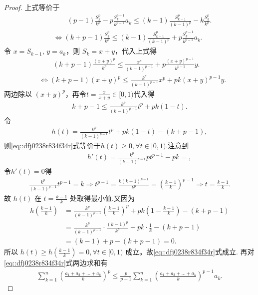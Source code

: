 \documentclass[../../main.tex]{subfiles}
\begin{document}
\begin{proof}
上式等价于
\begin{align*}
&\qquad (p-1)\frac{S_{k}^{p}}{k^p}-p\frac{S_{k}^{p-1}}{k^{p-1}}a_k\leqslant (k-1)\frac{S_{k-1}^{p}}{(k-1)^p}-k\frac{S_{k}^{p}}{k^p}.
\\
&\Longleftrightarrow (k+p-1)\frac{S_{k}^{p}}{k^p}\leqslant (k-1)\frac{S_{k-1}^{p}}{(k-1)^p}+p\frac{S_{k}^{p-1}}{k^{p-1}}a_k.
\end{align*}
令 $x = S_{k-1}$, $y = a_k$，则 $S_k = x + y$，代入上式得
\begin{align*}
&\qquad (k+p-1)\frac{(x+y)^p}{k^p}\leqslant \frac{x^p}{(k-1)^{p-1}}+p\frac{(x+y)^{p-1}}{k^{p-1}}y.
\\
&\Longleftrightarrow (k+p-1)(x+y)^p\leqslant \frac{k^p}{(k-1)^{p-1}}x^p+pk(x+y)^{p-1}y.
\end{align*}
两边除以 $(x+y)^p$，再令$t = \frac{x}{x+y} \in [0,1)$代入得
\begin{align*}
k+p-1 \leqslant \frac{k^p}{(k-1)^{p-1}} t^p + p k (1-t).
\end{align*}
令
\begin{align*}
h(t) = \frac{k^p}{(k-1)^{p-1}} t^p + p k (1-t) - (k+p-1),
\end{align*}
则\eqref{eq::dfj0238r834f34r}式等价于$h(t)\geqslant 0,\forall t\in [0,1).$注意到
\begin{align*}
&\qquad h'(t) = \frac{k^p}{(k-1)^{p-1}} p t^{p-1} - p k=,
\end{align*}
令$h'(t)=0$得
\begin{align*}
\frac{k^p}{(k-1)^{p-1}}t^{p-1}=k\Longrightarrow t^{p-1}=\frac{k(k-1)^{p-1}}{k^p}=\left( \frac{k-1}{k} \right) ^{p-1}\Longrightarrow t=\frac{k-1}{k}.
\end{align*}
故 $h(t)$ 在 $t = \frac{k-1}{k}$ 处取得最小值.又因为
\begin{align*}
h\left( \frac{k-1}{k} \right) &= \frac{k^p}{(k-1)^{p-1}} \left( \frac{k-1}{k} \right)^p + p k \left(1 - \frac{k-1}{k} \right) - (k+p-1) \\
&= \frac{k^p}{(k-1)^{p-1}} \cdot \frac{(k-1)^p}{k^p} + p k \cdot \frac{1}{k} - (k+p-1) \\
&= (k-1) + p - (k+p-1) = 0.
\end{align*}
所以
$h(t) \geqslant h(\frac{k-1}{k}) = 0 , \forall t \in [0,1)$ 成立。故\eqref{eq::dfj0238r834f34r}式成立.
再对\eqref{eq::dfj0238r834f34r}式两边求和有
\begin{align*}
\sum_{k=1}^n \left( \frac{a_1 + a_2 + \dots + a_k}{k} \right)^p \leqslant \frac{p}{p - 1} \sum_{k=1}^n \left( \frac{a_1 + a_2 + \dots + a_k}{k} \right)^{p - 1} a_k.
\end{align*}

\end{proof}
\end{document}
